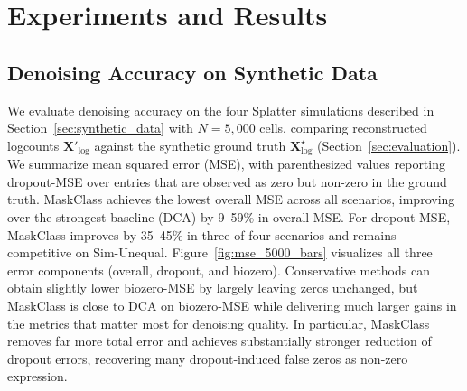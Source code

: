 \documentclass[sigconf,review]{acmart}
\theoremstyle{plain}
\theoremstyle{definition}
\theoremstyle{remark}
\begin{document}
\section{Experiments and Results}
\label{sec:experiments}

\subsection{Denoising Accuracy on Synthetic Data}
\label{sec:denoising_results}
We evaluate denoising accuracy on the four Splatter simulations described in
Section~\ref{sec:synthetic_data} with $N=5{,}000$ cells, comparing reconstructed logcounts
$\mathbf{X}'_{\log}$ against the synthetic ground truth
$\mathbf{X}^{\star}_{\log}$ (Section~\ref{sec:evaluation}). We summarize mean squared
error (MSE), with parenthesized values reporting
dropout-MSE over entries that are observed as zero but non-zero in the ground
truth. MaskClass achieves the lowest overall MSE across all scenarios,
improving over the strongest baseline (DCA) by 9--59\% in overall MSE. For
dropout-MSE, MaskClass improves by 35--45\% in three of four scenarios and
remains competitive on Sim-Unequal. Figure~\ref{fig:mse_5000_bars} visualizes all three error
components (overall, dropout, and biozero). Conservative methods can obtain
slightly lower biozero-MSE by largely leaving zeros unchanged, but MaskClass is
close to DCA on biozero-MSE while delivering much larger gains in the metrics
that matter most for denoising quality. In particular, MaskClass removes far
more total error and achieves substantially stronger reduction of dropout errors,
recovering many dropout-induced false zeros as non-zero expression.
\end{document}
